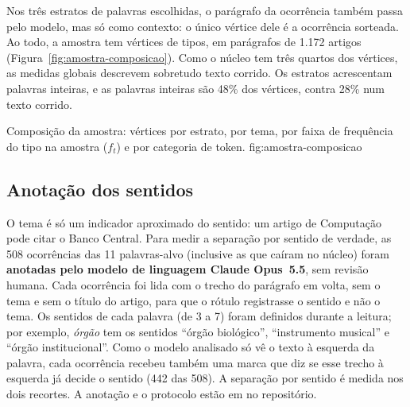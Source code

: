 Nos três estratos de palavras escolhidas, o parágrafo da ocorrência também passa pelo modelo,
mas só como contexto: o único vértice dele é a ocorrência sorteada. Ao todo, a amostra tem
\nVertices{} vértices de \nTipos{} tipos, em \nSequencias{} parágrafos de 1.172 artigos
(Figura~\ref{fig:amostra-composicao}). Como o núcleo tem três quartos dos vértices, as medidas
globais descrevem sobretudo texto corrido. Os estratos acrescentam palavras inteiras, e as
palavras inteiras são 48\% dos vértices, contra 28\% num texto corrido.

    {Composição da amostra: vértices por estrato, por tema, por faixa de frequência do tipo na
    amostra ($f_t$) e por categoria de token.}
    {fig:amostra-composicao}

\subsection{Anotação dos sentidos}\label{sec:dados-sentidos}

O tema é só um indicador aproximado do sentido: um artigo de Computação pode citar o Banco
Central. Para medir a separação por sentido de verdade, as 508 ocorrências das 11 palavras-alvo
(inclusive as que caíram no núcleo) foram \textbf{anotadas pelo modelo de linguagem Claude
Opus~5.5}, sem revisão humana. Cada ocorrência foi lida com o trecho do parágrafo em volta, sem
o tema e sem o título do artigo, para que o rótulo registrasse o sentido e não o tema. Os
sentidos de cada palavra (de 3 a 7) foram definidos durante a leitura; por exemplo,
\emph{órgão} tem os sentidos ``órgão biológico'', ``instrumento musical'' e ``órgão
institucional''. Como o modelo analisado só vê o texto à esquerda da palavra, cada ocorrência
recebeu também uma marca que diz se esse trecho à esquerda já decide o sentido (442 das 508).
A separação por sentido é medida nos dois recortes. A anotação e o protocolo estão em
 no repositório.

